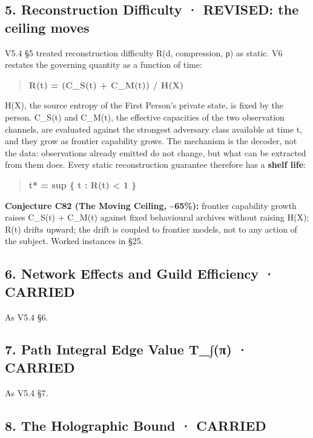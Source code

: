 \documentclass[
]{article}
\begin{document}
\subsection{5. Reconstruction Difficulty · REVISED: the ceiling
moves}\label{reconstruction-difficulty-revised-the-ceiling-moves}

V5.4 §5 treated reconstruction difficulty R(d, compression, ρ) as
static. V6 restates the governing quantity as a function of time:

\begin{quote}
\textbf{R(t) = (C\_S(t) + C\_M(t)) / H(X)}
\end{quote}

H(X), the source entropy of the First Person's private state, is fixed
by the person. C\_S(t) and C\_M(t), the effective capacities of the two
observation channels, are evaluated against the strongest adversary
class available at time t, and they grow as frontier capability grows.
The mechanism is the decoder, not the data: observations already emitted
do not change, but what can be extracted from them does. Every static
reconstruction guarantee therefore has a \textbf{shelf life}:

\begin{quote}
\textbf{t* = sup \{ t : R(t) \textless{} 1 \}}
\end{quote}

\textbf{Conjecture C82 (The Moving Ceiling, \textasciitilde65\%):}
frontier capability growth raises C\_S(t) + C\_M(t) against fixed
behavioural archives without raising H(X); R(t) drifts upward; the drift
is coupled to frontier models, not to any action of the subject. Worked
instances in §25.

\subsection{6. Network Effects and Guild Efficiency ·
CARRIED}\label{network-effects-and-guild-efficiency-carried}

As V5.4 §6.

\subsection{7. Path Integral Edge Value T\_∫(π) ·
CARRIED}\label{path-integral-edge-value-t_ux3c0-carried}

As V5.4 §7.

\subsection{8. The Holographic Bound ·
CARRIED}\label{the-holographic-bound-carried}
\end{document}
